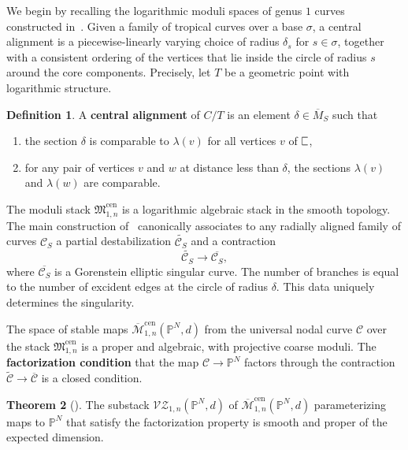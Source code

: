 \documentclass[11pt]{amsart}
\newcommand{\plC}{\scalebox{0.8}[1.3]{$\sqsubset$}}
\renewcommand{\to}{\rightarrow}
\theoremstyle{definition}
\newtheorem{thm}{Theorem}[section]
\theoremstyle{definition}
\newtheorem{definition}[thm]{Definition}
\begin{document}
We begin by recalling the logarithmic moduli spaces of genus $1$ curves constructed in~\cite[Sections 2 \& 4]{RSPW}. Given a family of tropical curves over a base $\sigma$, a central alignment is a piecewise-linearly varying choice of radius $\delta_s$ for $s\in\sigma$, together with a consistent ordering of the vertices that lie inside the circle of radius $s$ around the core components. Precisely, let $T$ be a geometric point with logarithmic structure.

\begin{definition}
A \textbf{central alignment} of $C/T$ is an element $\delta\in\overline{M}_S$ such that
\begin{enumerate}
    \item the section $\delta$ is comparable to $\lambda(v)$ for all vertices $v$ of $\plC$,
    \item for any pair of vertices $v$ and $w$ at distance less than $\delta$, the sections $\lambda(v)$ and $\lambda(w)$ are comparable.
\end{enumerate}
\end{definition}

The moduli stack $\mathfrak M_{1,n}^{\mathrm{cen}}$ is a logarithmic algebraic stack in the smooth topology. The main construction of~\cite{RSPW} canonically associates to any radially aligned family of curves $\mathcal C_S$ a partial destabilization $\widetilde{\mathcal C_S}$ and a contraction
\[
\widetilde{\mathcal C_S}\to \overline{\mathcal C_S},
\]
where $\overline{\mathcal C_S}$ is a Gorenstein elliptic singular curve. The number of branches is equal to the number of excident edges at the circle of radius $\delta$. This data uniquely determines the singularity.

The space of stable maps $\overline{\mathcal M}^{\mathrm{cen}}_{1,n}(\mathbb P^N,d)$ from the universal nodal curve $\mathcal C$ over the stack $\mathfrak M_{1,n}^{\mathrm{cen}}$ is a proper and algebraic, with projective coarse moduli. The \textbf{factorization condition} that the map $\mathcal C\to \mathbb P^N$ factors through the contraction $\widetilde{\mathcal C}\to \overline{\mathcal C}$ is a closed condition. 
\begin{thm}[{\cite[Theorem B]{RSPW}}]
The substack $\mathcal{VZ}_{1,n}(\mathbb P^N,d)$ of $\overline{\mathcal M}^{\mathrm{cen}}_{1,n}(\mathbb P^N,d)$ parameterizing maps to $\mathbb P^N$ that satisfy the factorization property is smooth and proper of the expected dimension.
\end{thm}
\end{document}
